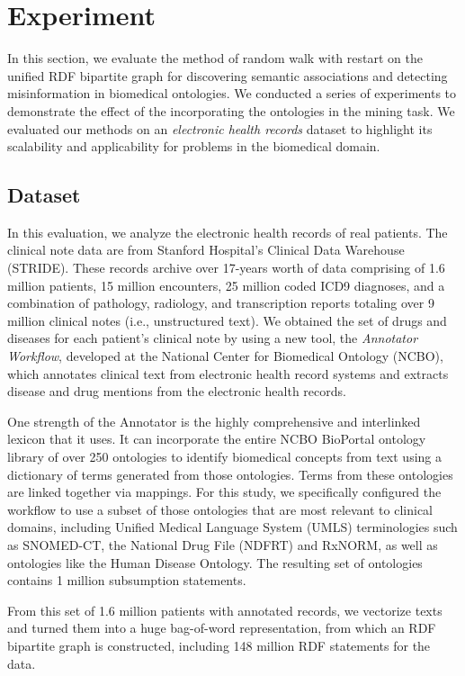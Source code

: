 \section{Experiment}
\label{experiment}
In this section, we evaluate the method of random walk with restart on the unified RDF bipartite graph for discovering semantic associations and detecting misinformation in biomedical ontologies. We conducted a series of experiments to demonstrate the effect of the incorporating the ontologies in the mining task. We evaluated our methods on an \emph{electronic health records} dataset to highlight its scalability and applicability for problems in the biomedical domain.

\subsection{Dataset}
In this evaluation, we analyze the electronic health records of real patients. The clinical note data are from Stanford Hospital's Clinical Data Warehouse (STRIDE). These records archive over 17-years worth of data comprising of 1.6 million patients, 15 million encounters, 25 million coded ICD9 diagnoses, and a combination of pathology, radiology, and transcription reports totaling over 9 million clinical notes (i.e., unstructured text).
We obtained the set of drugs and diseases for each patient's clinical note by using a new tool, the \emph{Annotator Workflow}, developed at the National Center for Biomedical Ontology (NCBO), which annotates clinical text from electronic health record systems and extracts disease and drug mentions from the electronic health records.


One strength of the Annotator is the highly comprehensive and interlinked lexicon that it uses. It can incorporate the entire NCBO BioPortal ontology library of over 250 ontologies to identify biomedical concepts from text using a dictionary of terms generated from those ontologies. Terms from these ontologies are linked together via mappings. For this study, we specifically configured the workflow to use a subset of those ontologies that are most relevant to clinical domains, including Unified Medical Language System (UMLS) terminologies such as SNOMED-CT, the National Drug File (NDFRT) and RxNORM, as well as ontologies like the Human Disease Ontology. The resulting set of ontologies contains 1 million subsumption statements.

From this set of 1.6 million patients with annotated records, we vectorize texts and turned them into a huge bag-of-word representation, from which an RDF bipartite graph is constructed, including 148 million RDF statements for the data.

